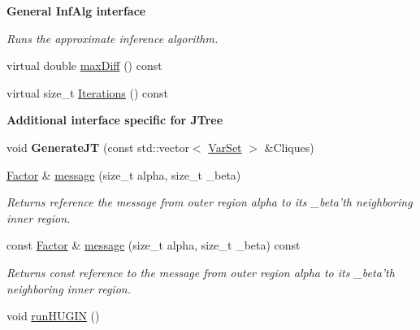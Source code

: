 \begin{Indent}{\bf General InfAlg interface}
\begin{CompactItemize}
\begin{CompactList}\small\item\em Runs the approximate inference algorithm. \item\end{CompactList}\item 
virtual double \hyperlink{classdai_1_1JTree_acd3916835c9d349aa1b22a2dd54de83}{maxDiff} () const 
\item 
virtual size\_\-t \hyperlink{classdai_1_1JTree_71cd98f072d69f6ce60af8b52ef02eb8}{Iterations} () const 
\end{CompactItemize}
\end{Indent}
\begin{Indent}{\bf Additional interface specific for JTree}\par
\begin{CompactItemize}
\item 
\hypertarget{classdai_1_1JTree_0898a401baee9af694f636d174048a46}{
void \textbf{GenerateJT} (const std::vector$<$ \hyperlink{classdai_1_1VarSet}{VarSet} $>$ \&Cliques)}
\label{classdai_1_1JTree_0898a401baee9af694f636d174048a46}

\item 
\hypertarget{classdai_1_1JTree_5a96942bd16a4e4e10fcf720c1b0e04b}{
\hyperlink{classdai_1_1TFactor}{Factor} \& \hyperlink{classdai_1_1JTree_5a96942bd16a4e4e10fcf720c1b0e04b}{message} (size\_\-t alpha, size\_\-t \_\-beta)}
\label{classdai_1_1JTree_5a96942bd16a4e4e10fcf720c1b0e04b}

\begin{CompactList}\small\item\em Returns reference the message from outer region alpha to its \_\-beta'th neighboring inner region. \item\end{CompactList}\item 
\hypertarget{classdai_1_1JTree_e59c0012cbd6a425704fd637f9fed4c5}{
const \hyperlink{classdai_1_1TFactor}{Factor} \& \hyperlink{classdai_1_1JTree_e59c0012cbd6a425704fd637f9fed4c5}{message} (size\_\-t alpha, size\_\-t \_\-beta) const }
\label{classdai_1_1JTree_e59c0012cbd6a425704fd637f9fed4c5}

\begin{CompactList}\small\item\em Returns const reference to the message from outer region alpha to its \_\-beta'th neighboring inner region. \item\end{CompactList}\item 
\hypertarget{classdai_1_1JTree_4569d21624cb49d9a79c3c8332e0d4b3}{
void \hyperlink{classdai_1_1JTree_4569d21624cb49d9a79c3c8332e0d4b3}{runHUGIN} ()}
\label{classdai_1_1JTree_4569d21624cb49d9a79c3c8332e0d4b3}


\end{CompactItemize}
\end{Indent}
